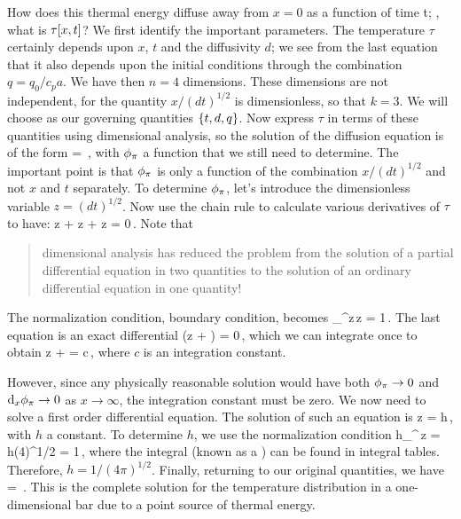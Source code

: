 How does this thermal energy diffuse away from $x = 0$ as a function of time t; \ie, what is $\tau\!\left[{x,t}\right]$? We first identify the important parameters. The temperature $\tau$ certainly depends upon $x$, $t$ and the diffusivity $d$; we see from the last equation that it also depends upon the initial conditions through the combination $q = q_0/c_p a$. We have then $n = 4$ dimensions. These dimensions are not independent, for the quantity $x/\left(dt\right)^{1/2}$ is dimensionless, so that $k = 3$. We will choose as our governing quantities $\left\lbrace{t, d, q}\right\rbrace$. Now express $\tau$ in terms of these quantities using dimensional analysis, so the solution of the diffusion equation is of the form
\beq
\tau{} = \kdimf{}\,,
\eeq
with $\phi_{\pi}$ a function that we still need to determine. The important point is that $\phi_{\pi}$ is only a function of the combination $x/\left(dt\right)^{1/2}$ and not $x$ and $t$ separately. To determine $\phi_{\pi}$, let's introduce the dimensionless variable $z = \left(dt\right)^{1/2}$. Now use the chain rule to calculate various derivatives of $\tau$ to have:
\beq
{}z +  z + \kdimf\vat z = 0\,.
\eeq
Note that
\begin{quote}
dimensional analysis has reduced the problem from the solution of a partial differential equation in two quantities to the solution of an ordinary differential equation in one quantity!
\end{quote}
The normalization condition, boundary condition, becomes 
\beq
\int_\infty^\infty \kdimf\vat z\,\dx z = 1\,.
\eeq
The last equation is an exact differential
\beq
{}\left(\xod\kdimf z + \kdimf\right) = 0\,,
\eeq
which we can integrate once to obtain
\beq
\xod\kdimf z + \kdimf = c\,,
\eeq
where $c$ is an integration constant.

However, since any physically reasonable solution would have both $\phi_{\pi}\to 0$ and $\text{d}_{x}\phi_{\pi}\to 0$ as $x\to\infty$, the integration constant must be zero. We now need to solve a first order differential equation. The solution of such an equation is
\beq
\kdimf\vat z = h\exp{}\,,
\eeq
with $h$ a constant. To determine $h$, we use the normalization condition
\beq
h\int_\infty^\infty \exp{}\,\dx z = h\left(4\pi\right)^{1/2} = 1\,,
\eeq
where the integral (known as a ) can be found in integral tables. Therefore, $h = 1/\left(4\pi\right)^{1/2}$. Finally, returning to our original quantities, we have
\beq
\tau{} = \exp{}\,.
\eeq
This is the complete solution for the temperature distribution in a one-dimensional bar due to a point source of thermal energy.







